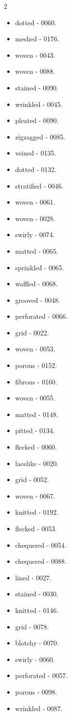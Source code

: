 \begin{multicols}{2}
\begin{itemize}
\item dotted - 0060.
\item meshed - 0176.
\item woven - 0043.
\item woven - 0088.
\item stained - 0090.
\item wrinkled - 0045.
\item pleated - 0090.
\item zigzagged - 0085.
\item veined - 0135.
\item dotted - 0132.
\item stratified - 0046.
\item woven - 0061.
\item woven - 0028.
\item swirly - 0074.
\item matted - 0065.
\item sprinkled - 0065.
\item waffled - 0068.
\item grooved - 0048.
\item perforated - 0066.
\item grid - 0022.
\item woven - 0053.
\item porous - 0152.
\item fibrous - 0160.
\item woven - 0055.
\item matted - 0148.
\item pitted - 0134.
\item flecked - 0060.
\item lacelike - 0020.
\item grid - 0052.
\item woven - 0067.
\item knitted - 0192.
\item flecked - 0053.
\item chequered - 0054.
\item chequered - 0088.
\item lined - 0027.
\item stained - 0030.
\item knitted - 0146.
\item grid - 0078.
\item blotchy - 0070.
\item swirly - 0060.
\item perforated - 0057.
\item porous - 0098.
\item wrinkled - 0087.

\end{itemize}
\end{multicols}
